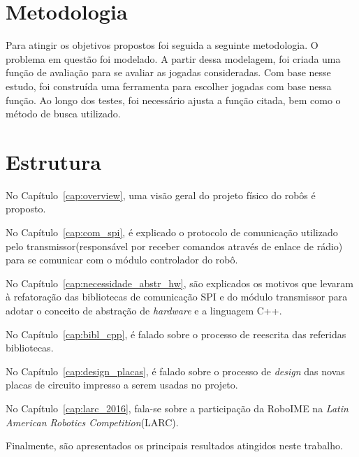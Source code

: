 \section{Metodologia}

Para atingir os objetivos propostos foi seguida a seguinte metodologia.
O problema em questão foi modelado. A partir dessa modelagem, foi
criada uma função de avaliação para se avaliar as jogadas consideradas.
Com base nesse estudo, foi construída uma ferramenta para escolher
jogadas com base nessa função. Ao longo dos testes, foi necessário
ajusta a função citada, bem como o método de busca utilizado.

\section{Estrutura}

%
%
%
%
%
%

No Capítulo~\ref{cap:overview}, uma visão geral do projeto físico do robôs é proposto.

No Capítulo~\ref{cap:com_spi}, é explicado o protocolo de comunicação utilizado pelo transmissor(responsável por receber comandos através de enlace de rádio) para se comunicar com o módulo controlador do robô.

No Capítulo~\ref{cap:necessidade_abstr_hw}, são explicados os motivos que levaram à refatoração das bibliotecas de comunicação SPI e do módulo transmissor para adotar o conceito de abstração de \textit{hardware} e a linguagem C++. 

No Capítulo~\ref{cap:bibl_cpp}, é falado sobre o processo de reescrita das referidas bibliotecas.

No Capítulo~\ref{cap:design_placas}, é falado sobre o processo de \textit{design} das novas placas de circuito impresso a serem usadas no projeto.

No Capítulo~\ref{cap:larc_2016}, fala-se sobre a participação da RoboIME na \textit{Latin American Robotics Competition}(LARC).


Finalmente, são apresentados os principais resultados atingidos neste trabalho.


